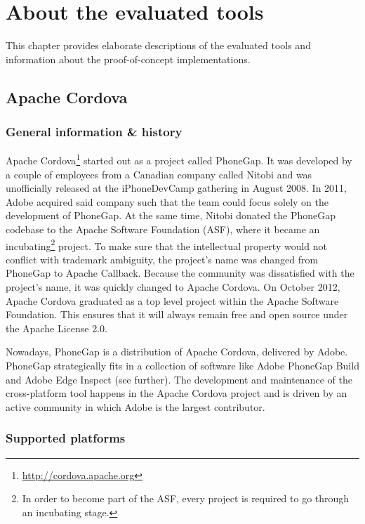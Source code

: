 \chapter{About the evaluated tools}
\label{chap:tools}

This chapter provides elaborate descriptions of the evaluated tools and information about the proof-of-concept implementations. 

\section{Apache Cordova}

\subsection{General information \& history}

Apache Cordova\footnote{\url{http://cordova.apache.org}} started out as a project called PhoneGap. It was developed by a couple of employees from a Canadian company called Nitobi and was unofficially released at the iPhoneDevCamp gathering in August 2008. In 2011, Adobe acquired said company such that the team could focus solely on the development of PhoneGap. At the same time, Nitobi donated the PhoneGap codebase to the Apache Software Foundation (ASF), where it became an incubating\footnote{In order to become part of the ASF, every project is required to go through an incubating stage.} project. To make sure that the intellectual property would not conflict with trademark ambiguity, the project's name was changed from PhoneGap to Apache Callback. Because the community was dissatisfied with the project's name, it was quickly changed to Apache Cordova. On October 2012, Apache Cordova graduated as a top level project within the Apache Software Foundation. This ensures that it will always remain free and open source under the Apache License 2.0.

Nowadays, PhoneGap is a distribution of Apache Cordova, delivered by Adobe. PhoneGap strategically fits in a collection of software like Adobe PhoneGap Build and Adobe Edge Inspect (see further). The development and maintenance of the cross-platform tool happens in the Apache Cordova project and is driven by an active community in which Adobe is the largest contributor.

\subsection{Supported platforms}
\label{sec:ac:support}

